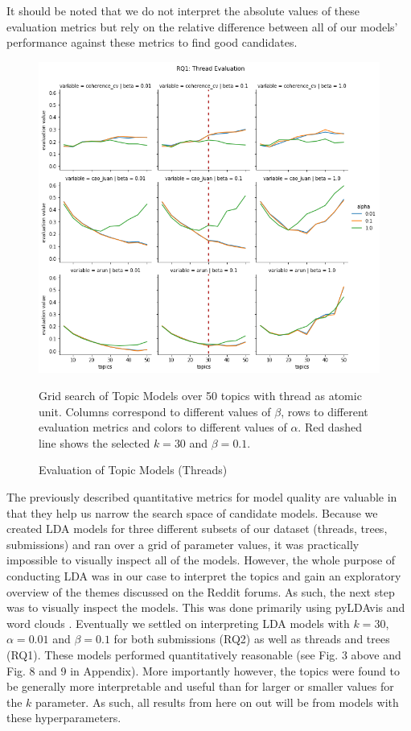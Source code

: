 \documentclass{article}
\begin{document}
It should be noted that we do not interpret the absolute values of these evaluation metrics but rely on the relative difference between all of our models' performance against these metrics to find good candidates. 

\begin{figure}[H]
    \begin{centering}
    \includegraphics[width = \textwidth]{../Figure/H1_thread_red.png}
    \caption{Evaluation of Topic Models (Threads)}
    \end{centering}
    \begin{footnotesize} 
        Grid search of Topic Models over 50 topics with thread as atomic unit. Columns correspond to different values of $\beta$, rows to different evaluation metrics and colors to different values of $\alpha$. Red dashed line shows the selected $k = 30$ and $\beta = 0.1$. 
    \end{footnotesize}
\end{figure}

The previously described quantitative metrics for model quality are valuable in that they help us narrow the search space of candidate models. Because we created LDA models for three different subsets of our dataset (threads, trees, submissions) and ran over a grid of parameter values, it was practically impossible to visually inspect all of the models. However, the whole purpose of conducting LDA was in our case to interpret the topics and gain an exploratory overview of the themes discussed on the Reddit forums. As such, the next step was to visually inspect the models. This was done primarily using pyLDAvis and word clouds \cite{sievert2014ldavis}. 
Eventually we settled on interpreting LDA models with $k = 30$, $\alpha = 0.01$ and $\beta = 0.1$ for both submissions (RQ2) as well as threads and trees (RQ1). These models performed quantitatively reasonable (see Fig. 3 above and Fig. 8 and 9 in Appendix). More importantly however, the topics were found to be generally more interpretable and useful than for larger or smaller values for the $k$ parameter. As such, all results from here on out will be from models with these hyperparameters. 
\end{document}
